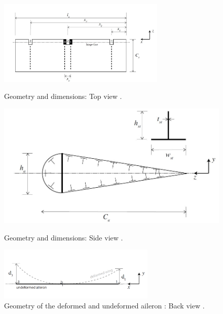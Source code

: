 \begin{figure}[H]
\begin{minipage}[b]{0.45\linewidth}
\centering
\includegraphics[width=8cm]{Images/Dimension_top_view.jpg}
\caption{Geometry and dimensions: Top view \cite{Assignment_description}.}
\label{fig:Dimensions_top_view}
\end{minipage}
\hspace{0.5cm}
\begin{minipage}[b]{0.45\linewidth}
\centering
\includegraphics[scale=0.1]{Images/Dimension_side_view.jpg}
\caption{Geometry and dimensions: Side view \cite{Assignment_description}. }
\label{fig:Dimensions_side_view}
\end{minipage}
\begin{minipage}[b]{\linewidth}
\centering
\includegraphics[width=7.5cm]{Images/Dimension_back_view.jpg}
\caption{Geometry of the deformed and undeformed aileron : Back view \cite{Assignment_description}.}
\label{fig:Dimensions_back_view}
\end{minipage}
\end{figure}

